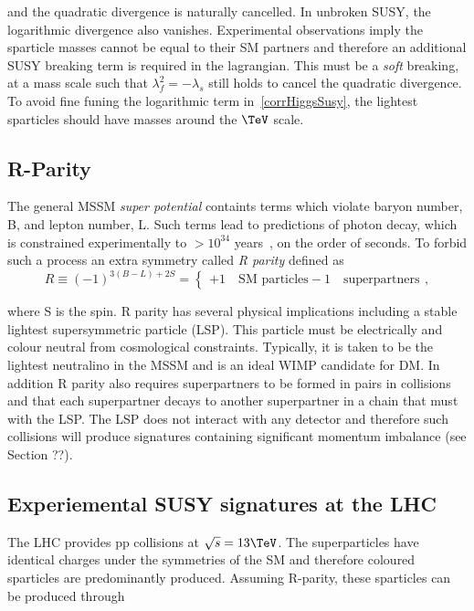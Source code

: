 and the quadratic divergence is naturally cancelled. In unbroken SUSY, the logarithmic divergence also vanishes. 
Experimental observations imply the sparticle masses cannot be equal to their SM partners and
therefore an additional SUSY breaking term is required in the lagrangian. This must be a \emph{soft} breaking,
at a mass scale such that $\lambda_f^2 = -\lambda_s$ still holds to cancel the quadratic divergence.
To avoid fine funing the logarithmic term in~\ref{corrHiggsSusy}, the lightest sparticles should have 
masses around the $\TeV$ scale. 

\subsection{R-Parity}

The general MSSM \emph{super potential} containts terms which violate baryon number, B, and lepton number, 
L. Such terms lead to predictions of photon decay, which is constrained experimentally to $> 10^{34}$ years~\cite{}, 
on the order of seconds. To forbid such a process an extra symmetry called \emph{R parity} defined as 
\begin{equation}
R \equiv (-1)^{3(B-L)+2S} = 
\begin{cases}
+ 1\quad \text{SM particles}
- 1\quad \text{superpartners}
\end{cases},
\end{equation}

where S is the spin. R parity has several physical implications including a stable lightest supersymmetric 
particle (LSP). This particle must be electrically and colour neutral from cosmological constraints.
Typically, it is taken to be the lightest neutralino in the MSSM and is an ideal WIMP candidate for DM. 
In addition R parity also requires superpartners 
to be formed in pairs in collisions and that each superpartner decays to another superpartner
in a chain that must with the LSP. The LSP does not interact with any detector and therefore
such collisions will produce signatures containing significant momentum imbalance (see Section ??).

\subsection{Experiemental SUSY signatures at the LHC}

The LHC provides pp collisions at $\sqrt{s} = 13 \TeV$. The superparticles have identical charges under 
the symmetries of the SM and therefore coloured sparticles are predominantly produced. 
Assuming R-parity, these sparticles can be produced through

